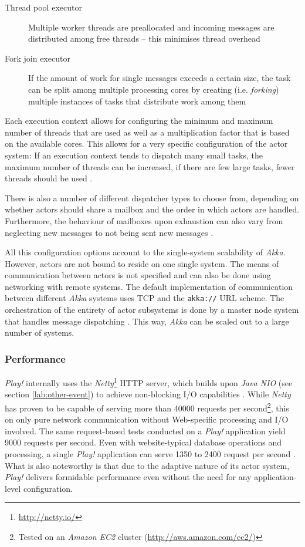 \begin{description}
  \item[Thread pool executor] Multiple worker threads are preallocated and incoming messages are distributed among free threads -- this minimises thread overhead
  \item[Fork join executor] If the amount of work for single messages exceeds a certain size, the task can be split among multiple processing cores by creating (i.e. \textit{forking}) multiple instances of tasks that distribute work among them
\end{description}

Each execution context allows for configuring the minimum and maximum number of threads that are used as well as a multiplication factor that is based on the available cores. This allows for a very specific configuration of the actor system: If an execution context tends to dispatch many small tasks, the maximum number of threads can be increased, if there are few large tasks, fewer threads should be used \cite[p. 105]{Gupta2012}.

There is also a number of different dispatcher types to choose from, depending on whether actors should share a mailbox and the order in which actors are handled. Furthermore, the behaviour of mailboxes upon exhaustion can also vary from neglecting new messages to not being sent new messages \cite[p. 104]{Gupta2012}. 

All this configuration options account to the single-system scalability of \textit{Akka}. However, actors are not bound to reside on one single system. The means of communication between actors is not specified and can also be done using networking with remote systems. The default implementation of communication between different \textit{Akka} systems uses TCP and the \texttt{akka://} URL scheme. The orchestration of the entirety of actor subsystems is done by a master node system that handles message dispatching \cite[p. 233]{Gupta2012}. This way, \textit{Akka} can be scaled out to a large number of systems.

\subsubsection*{Performance}
\textit{Play!} internally uses the \textit{Netty}\footnote{\url{http://netty.io/}} HTTP server, which builds upon \textit{Java NIO} (see section \ref{lab:other-event}) to achieve non-blocking I/O capabilities \cite[p. 52]{Scala}. While \textit{Netty} has proven to be capable of serving more than 40000 requests per second\footnote{Tested on an \textit{Amazon EC2} cluster (\url{http://aws.amazon.com/ec2/})}, this on only pure network communication without Web-specific processing and I/O involved. The same request-based tests conducted on a \textit{Play!} application yield 9000 requests per second. Even with website-typical database operations and processing, a single \textit{Play!} application can serve 1350 to 2400 request per second \cite{Papauschek2013}. What is also noteworthy is that due to the adaptive nature of its actor system, \textit{Play!} delivers formidable performance even without the need for any application-level configuration.

